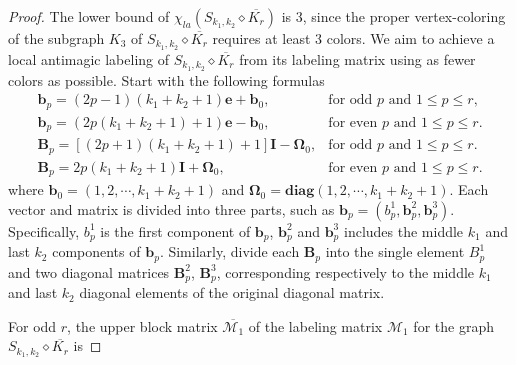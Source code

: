 \documentclass[12pt]{article}
\begin{document}
\begin{proof}
The lower bound of $\chi_{la}(S_{k_{1},k_{2}}\diamond \overline{K_{r}})$ is 3, since the proper vertex-coloring of the subgraph $K_{3}$ of $S_{k_{1},k_{2}}\diamond \overline{K_{r}}$ requires at least 3 colors. We aim to achieve a local antimagic labeling of $S_{k_{1},k_{2}}\diamond \overline{K_{r}}$ from its labeling matrix using as fewer colors as possible. Start with the following formulas
\begin{equation*}
  \begin{array}{ll}
  \boldsymbol{b}_{p}=(2p-1)(k_{1}+k_{2}+1)\boldsymbol{e}+\boldsymbol{b}_{0}, &\text{for odd $p$ and $1\leq p\leq r$},\\[8pt]
  \boldsymbol{b}_{p}=(2p(k_{1}+k_{2}+1)+1)\boldsymbol{e}-\boldsymbol{b}_{0}, &\text{for even $p$ and $1\leq p\leq r$}.\\[8pt]
  \boldsymbol{B}_{p}=[(2p+1)(k_{1}+k_{2}+1)+1]\boldsymbol{I}-\boldsymbol{\Omega}_{0}, &\text{for odd $p$ and $1\leq p\leq r$}.\\[8pt]
  \boldsymbol{B}_{p}=2p(k_{1}+k_{2}+1)\boldsymbol{I}+\boldsymbol{\Omega}_{0}, &\text{for even $p$ and $1\leq p\leq r$}.
  \end{array}
\end{equation*}
where $\boldsymbol{b}_{0}=(1,2,\cdots,k_{1}+k_{2}+1)$ and $\boldsymbol{\Omega}_{0}={\textbf{diag}}(1,2,\cdots,k_{1}+k_{2}+1)$. Each vector and matrix is divided into three parts, such as $\boldsymbol{b}_{p}=(b_{p}^{1},\boldsymbol{b}_{p}^{2},\boldsymbol{b}_{p}^{3})$. Specifically, $b_{p}^{1}$ is the first component of $\boldsymbol{b}_{p}$, $\boldsymbol{b}_{p}^{2}$ and $\boldsymbol{b}_{p}^{3}$ includes the middle $k_{1}$ and last $k_{2}$ components of $\boldsymbol{b}_{p}$. Similarly, divide each $\boldsymbol{B}_{p}$ into the single element ${B}_{p}^{1}$ and two diagonal matrices $\boldsymbol{B}_{p}^{2}$, $\boldsymbol{B}_{p}^{3}$, corresponding respectively to the middle $k_{1}$ and last $k_{2}$ diagonal elements of the original diagonal matrix.

For odd $r$, the upper block matrix $\overline{\boldsymbol{\mathcal{M}}_{1}}$ of the labeling matrix $\boldsymbol{\mathcal{M}}_{1}$ for the graph $S_{k_{1},k_{2}}\diamond \overline{K_{r}}$ is


\end{proof}
\end{document}
